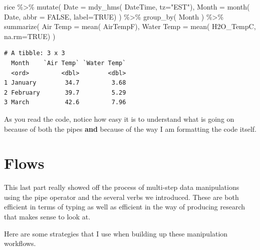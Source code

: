 \documentclass[
  letterpaper,
]{book}
\newenvironment{Shaded}{\begin{snugshade}}{\end{snugshade}}
\newcommand{\AttributeTok}[1]{\textcolor[rgb]{0.40,0.45,0.13}{#1}}
\newcommand{\ConstantTok}[1]{\textcolor[rgb]{0.56,0.35,0.01}{#1}}
\newcommand{\FunctionTok}[1]{\textcolor[rgb]{0.28,0.35,0.67}{#1}}
\newcommand{\NormalTok}[1]{\textcolor[rgb]{0.00,0.23,0.31}{#1}}
\newcommand{\OtherTok}[1]{\textcolor[rgb]{0.00,0.23,0.31}{#1}}
\newcommand{\SpecialCharTok}[1]{\textcolor[rgb]{0.37,0.37,0.37}{#1}}
\newcommand{\StringTok}[1]{\textcolor[rgb]{0.13,0.47,0.30}{#1}}
\begin{document}
\begin{Shaded}
\begin{Highlighting}[]
\NormalTok{rice }\SpecialCharTok{\%\textgreater{}\%}
  \FunctionTok{mutate}\NormalTok{( }\AttributeTok{Date =} \FunctionTok{mdy\_hms}\NormalTok{( DateTime, }
                          \AttributeTok{tz=}\StringTok{"EST"}\NormalTok{),}
          \AttributeTok{Month =} \FunctionTok{month}\NormalTok{( Date, }
                         \AttributeTok{abbr =} \ConstantTok{FALSE}\NormalTok{, }
                         \AttributeTok{label=}\ConstantTok{TRUE}\NormalTok{) ) }\SpecialCharTok{\%\textgreater{}\%}
  \FunctionTok{group\_by}\NormalTok{( Month ) }\SpecialCharTok{\%\textgreater{}\%}
  \FunctionTok{summarize}\NormalTok{( }\StringTok{\textasciigrave{}}\AttributeTok{Air Temp}\StringTok{\textasciigrave{}} \OtherTok{=} \FunctionTok{mean}\NormalTok{( AirTempF), }
             \StringTok{\textasciigrave{}}\AttributeTok{Water Temp}\StringTok{\textasciigrave{}} \OtherTok{=} \FunctionTok{mean}\NormalTok{( H2O\_TempC, }
                                  \AttributeTok{na.rm=}\ConstantTok{TRUE}\NormalTok{) )}
\end{Highlighting}
\end{Shaded}

\begin{verbatim}
# A tibble: 3 x 3
  Month    `Air Temp` `Water Temp`
  <ord>         <dbl>        <dbl>
1 January        34.7         3.68
2 February       39.7         5.29
3 March          42.6         7.96
\end{verbatim}

As you read the code, notice how easy it is to understand what is going
on because of both the pipes \textbf{and} because of the way I am
formatting the code itself.

\section{Flows}\label{flows}

This last part really showed off the process of multi-step data
manipulations using the pipe operator and the several verbs we
introduced. These are both efficient in terms of typing as well as
efficient in the way of producing research that makes sense to look at.

Here are some strategies that I use when building up these manipulation
workflows.
\end{document}
